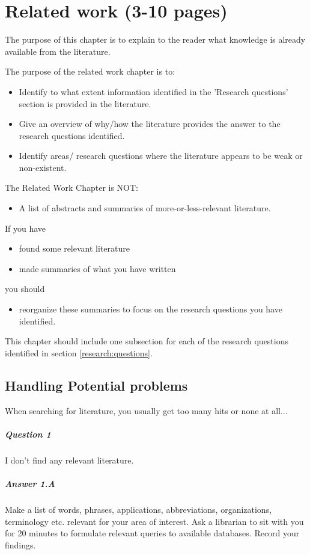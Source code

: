 \chapter{Related work (3-10 pages)}
The purpose of this chapter
is to explain to the reader what knowledge is already
available from the literature.

The purpose of the related work chapter is to:
\begin{itemize}
\item Identify to what extent information identified in the 'Research questions'  section is provided in the literature.
\item Give an overview of why/how the literature provides the answer to the research questions identified.
\item Identify areas/ research questions where the literature appears to be weak or non-existent.
\end{itemize}
The Related Work Chapter is NOT:
\begin{itemize}
\item   A list of abstracts and summaries of more-or-less-relevant literature.
\end{itemize}
If you have
\begin{itemize}
\item   found some relevant literature
\item   made summaries of what you have written
\end{itemize}
you should
\begin{itemize}
\item reorganize these summaries to focus on the research questions you have identified.
\end{itemize}

This chapter should include one subsection for each of the research
questions identified in section \ref{research:questions}.  

\section{Handling Potential problems}
When searching for literature, you usually get too many hits or none at all...

\paragraph{Question 1} I don't find any relevant literature.

\paragraph{Answer 1.A}  Make a list of words, phrases, applications, abbreviations,
organizations, terminology etc. relevant for your area of interest.
Ask a librarian to sit with you for 20 minutes to formulate relevant
queries to available databases.  Record your findings.


